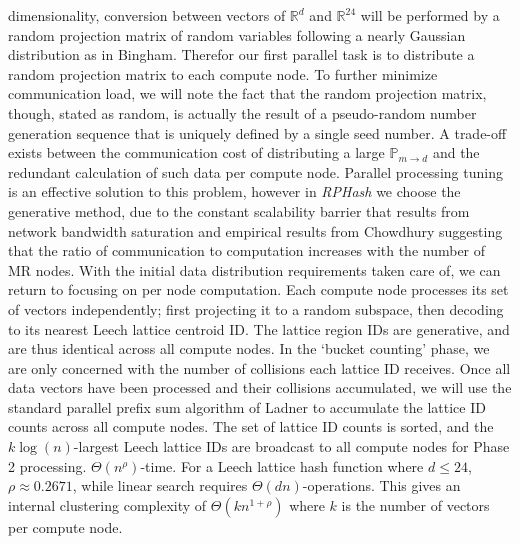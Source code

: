 \documentclass[a4paper,10pt]{article}
\begin{document}
dimensionality, conversion between vectors of $\mathbb{R}^d$ and 
$\mathbb{R}^{24}$  will be performed by a random projection matrix of random
variables
following a nearly Gaussian distribution as in Bingham\cite{bingham}.
Therefor our first parallel task is to distribute a random projection matrix to
each compute node. 
To further minimize communication load, we will note the fact that the random
projection matrix, though, stated as random, is actually the result of a
pseudo-random
number generation sequence that is uniquely defined by a single seed number.  A
trade-off
exists between the communication cost of distributing a large
$\mathbb{P}_{m\rightarrow d}$
and the redundant calculation of such data per compute node. Parallel processing
tuning 
is an effective solution to this problem, however in \emph{RPHash} we choose the
generative
method, due to the constant scalability barrier that results from network
bandwidth saturation
and empirical results from Chowdhury\cite{chowdhury} suggesting that the ratio
of communication
to computation increases with the number of MR nodes. 
With the initial data distribution requirements taken care of, we can return to
focusing on 
per node computation. Each compute node processes its set of vectors
independently; first 
projecting it to a random subspace, then decoding to its nearest Leech lattice
centroid ID.
The lattice region IDs are generative, and are thus identical across all compute
nodes.
In the `bucket
counting' phase, we are only concerned with the number of collisions each
lattice ID receives.
Once all data vectors have been processed and their collisions accumulated, 
we will use the standard parallel prefix sum algorithm of 
Ladner\cite{Ladner} to accumulate the lattice ID counts across all compute
nodes. The set of
lattice ID counts is sorted, and the $k\log(n)$-largest Leech lattice IDs are
broadcast to all compute
nodes for Phase 2 processing.
$\Theta(n^\rho)$-time.  
For a Leech lattice hash function where $d \leq24$,
$\rho \approx 0.2671 $\cite{Andoni}, while linear search requires $\Theta(d
n)$-operations.  This gives an internal clustering complexity of $\Theta(k
n^{1+\rho} )$ where $k$ is the number of vectors per compute node.  
\end{document}
